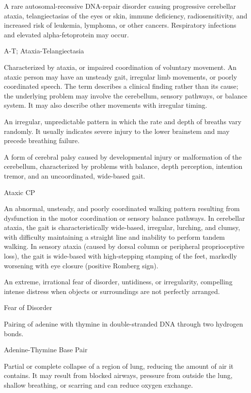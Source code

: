 A rare autosomal-recessive DNA-repair disorder causing progressive cerebellar ataxia, telangiectasias of the eyes or skin, immune deficiency, radiosensitivity, and increased risk of leukemia, lymphoma, or other cancers. Respiratory infections and elevated alpha-fetoprotein may occur.

\synonyms
A-T; Ataxia-Telangiectasia

 Characterized by ataxia, or impaired coordination of voluntary movement. An ataxic person may
have an unsteady gait, irregular limb movements, or poorly coordinated speech. The term describes
a clinical finding rather than its cause; the underlying problem may involve the cerebellum,
sensory pathways, or balance system. It may also describe other movements with irregular timing.

 An irregular, unpredictable pattern in which the rate and depth of breaths vary randomly. It usually indicates severe injury to the lower brainstem and may precede breathing failure.

 A form of cerebral palsy caused by developmental injury or malformation of the cerebellum, characterized by problems with balance, depth perception, intention tremor, and an uncoordinated, wide-based gait.

\synonyms
Ataxic CP

 An abnormal, unsteady, and poorly coordinated walking pattern resulting from dysfunction in the motor coordination or sensory balance pathways. In cerebellar ataxia, the gait is characteristically wide-based, irregular, lurching, and clumsy, with difficulty maintaining a straight line and inability to perform tandem walking. In sensory ataxia (caused by dorsal column or peripheral proprioceptive loss), the gait is wide-based with high-stepping stamping of the feet, markedly worsening with eye closure (positive Romberg sign).

 An extreme, irrational fear of disorder, untidiness, or irregularity, compelling intense distress when objects or surroundings are not perfectly arranged.

\synonyms
Fear of Disorder

 Pairing of adenine with thymine in double-stranded DNA through two hydrogen bonds.

\synonyms
Adenine-Thymine Base Pair

 Partial or complete collapse of a region of lung, reducing the amount of air it contains. It may result from blocked airways, pressure from outside the lung, shallow breathing, or scarring and can reduce oxygen exchange.

